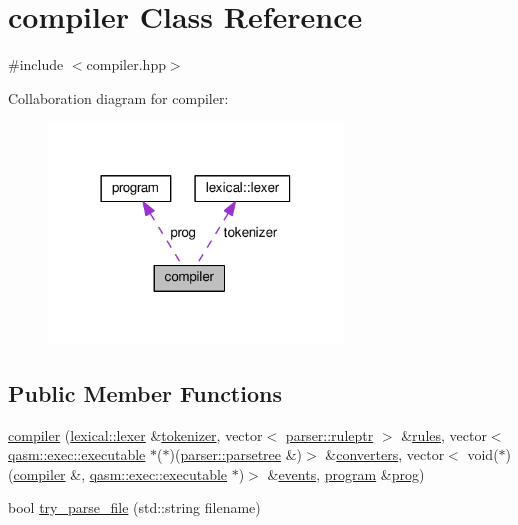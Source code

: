 \hypertarget{classcompiler}{}\section{compiler Class Reference}
\label{classcompiler}


{\ttfamily \#include $<$compiler.\+hpp$>$}



Collaboration diagram for compiler\+:
\nopagebreak
\begin{figure}[H]
\begin{center}
\leavevmode
\includegraphics[width=222pt]{classcompiler__coll__graph}
\end{center}
\end{figure}
\subsection*{Public Member Functions}
\begin{DoxyCompactItemize}
\item 
\hyperlink{classcompiler_aac603e3e8c3851dfb420e6e007adbad0}{compiler} (\hyperlink{classlexical_1_1lexer}{lexical\+::lexer} \&\hyperlink{classcompiler_a888ac16dbb82fa8a9500633addcd22ba}{tokenizer}, vector$<$ \hyperlink{namespaceparser_a85b2df48287fddaca144a5f6c01b4761}{parser\+::ruleptr} $>$ \&\hyperlink{classcompiler_a1b712963929882f359df919ce73bbf4e}{rules}, vector$<$ \hyperlink{classqasm_1_1exec_1_1executable}{qasm\+::exec\+::executable} $\ast$($\ast$)(\hyperlink{structparser_1_1parsetree}{parser\+::parsetree} \&)$>$ \&\hyperlink{classcompiler_a76cbb22ce5238f2fd9b3946f541dba0c}{converters}, vector$<$ void($\ast$)(\hyperlink{classcompiler}{compiler} \&, \hyperlink{classqasm_1_1exec_1_1executable}{qasm\+::exec\+::executable} $\ast$)$>$ \&\hyperlink{classcompiler_aa9d1b362adff0ca48511cf824ca1fe4c}{events}, \hyperlink{classprogram}{program} \&\hyperlink{classcompiler_a801700690bf711169679cb6ca890168a}{prog})
\item 
bool \hyperlink{classcompiler_af3984a0a53279c28bee8aee4b0ef84ca}{try\+\_\+parse\+\_\+file} (std\+::string filename)
\end{DoxyCompactItemize}
